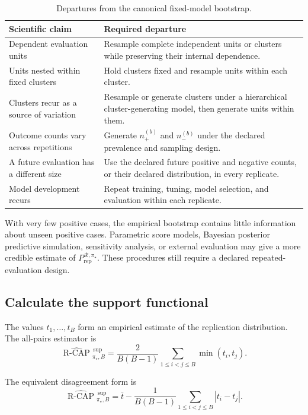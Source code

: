 \documentclass[11pt]{article}
\newcommand{\Regime}{\mathcal{R}}
\newcommand{\RCAPHatB}{\widehat{\operatorname{R\text{-}CAP}}{}^{\,\mathrm{sup}}_{\pi_\star,B}}
\newcommand{\PRep}{P_{\mathrm{rep}}^{\Regime,\pi_\star}}
\theoremstyle{remark}
\begin{document}
\begin{table}[ht]
\centering
\caption{Departures from the canonical fixed-model bootstrap.}
\label{tab:replication}
\begin{tabularx}{\textwidth}{@{}>{\raggedright\arraybackslash}p{}>{\raggedright\arraybackslash}X@{}}
\toprule
Scientific claim & Required departure \\
\midrule
Dependent evaluation units & Resample complete independent units or clusters while preserving their internal dependence. \\
Units nested within fixed clusters & Hold clusters fixed and resample units within each cluster. \\
Clusters recur as a source of variation & Resample or generate clusters under a hierarchical cluster-generating model, then generate units within them. \\
Outcome counts vary across repetitions & Generate $n_+^{(b)}$ and $n_-^{(b)}$ under the declared prevalence and sampling design. \\
A future evaluation has a different size & Use the declared future positive and negative counts, or their declared distribution, in every replicate. \\
Model development recurs & Repeat training, tuning, model selection, and evaluation within each replicate. \\
\bottomrule
\end{tabularx}
\end{table}

With very few positive cases, the empirical bootstrap contains little information about unseen positive cases. Parametric score models, Bayesian posterior predictive simulation, sensitivity analysis, or external evaluation may give a more credible estimate of $\PRep$. These procedures still require a declared repeated-evaluation design.

\subsection{Calculate the support functional}

The values $t_1,\ldots,t_B$ form an empirical estimate of the replication distribution. The all-pairs estimator is
\begin{equation}
\RCAPHatB
=
\frac{2}{B(B-1)}
\sum_{1\leq i<j\leq B}
\min(t_i,t_j).
\label{eq:uestimator}
\end{equation}

The equivalent disagreement form is
\begin{equation}
\RCAPHatB
=
\bar t
-
\frac{1}{B(B-1)}
\sum_{1\leq i<j\leq B}
|t_i-t_j|.
\label{eq:uestimator-disagreement}
\end{equation}
\end{document}
